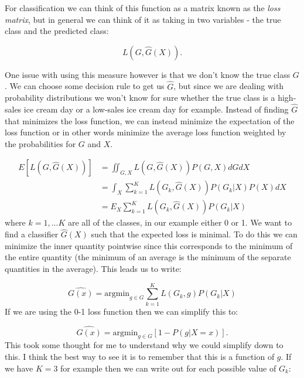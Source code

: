 For classification we can think of this function as a matrix known as the \emph{loss matrix}, but in general we can think of it as taking in two variables - the true class and the predicted class:

\begin{equation}
L(G, \hat{G}(X)).
\end{equation}

One issue with using this measure however is that we don't know the true class $G$. We can choose some decision rule to get us $\hat{G}$, but since we are dealing with probability distributions we won't know for sure whether the true class is a high-sales ice cream day or a low-sales ice cream day for example. Instead of finding $\hat{G}$ that minimizes the loss function, we can instead minimize the expectation of the loss function or in other words minimize the average loss function weighted by the probabilities for $G$ and $X$.

\begin{equation}
\begin{split}
E[L(G, \hat{G}(X))] & = \iint_{G, X} {L(G, \hat{G}(X)) P(G, X) dG dX} \\
& = \int_{X} \sum_{k=1}^{K} {L(G_k, \hat{G}(X)) P(G_k|X) P(X) dX} \\
&= E_{X} \sum_{k=1}^{K} {L(G_k, \hat{G}(X)) P(G_k|X)}
\end{split}
\end{equation}
where $k=1,...K$ are all of the classes, in our example either 0 or 1. We want to find a classifier $\hat{G}(X)$ such that the expected loss is minimal. To do this we can minimize the inner quantity pointwise since this corresponds to the minimum of the entire quantity (the minimum of an average is the minimum of the separate quantities in the average). This leads us to write:

\begin{equation}
\hat{G(x)} = \text{argmin}_{g \in G} \sum_{k=1}^{K} {L(G_k, g) P(G_k|X)}
\end{equation}
If we are using the 0-1 loss function then we can simplify this to:

\begin{equation}
\hat{G(x)} = \text{argmin}_{g \in G} \left[1 - P(g|X=x) \right].
\end{equation}
This took some thought for me to understand why we could simplify down to this. I think the best way to see it is to remember that this is a function of $g$. If we have $K=3$ for example then we can write out for each possible value of $G_k$:

